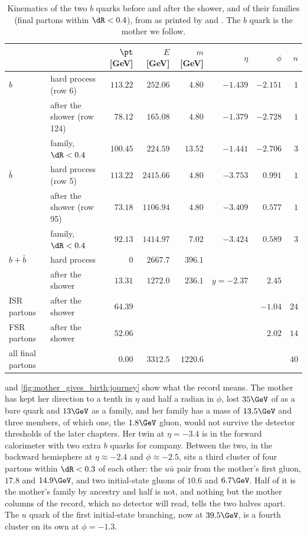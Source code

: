 \begin{table}[htbp]\centering\small
\caption[Kinematics of the two $b$ quarks and their families after the shower]{Kinematics
of the two $b$ quarks before and after the shower, and of their families
(final partons within $\dR<0.4$), from  as printed by
 and . The
$b$ quark is the mother we follow.}
\label{tab:mother_gives_birth:kinematics}
\footnotesize
\begin{tabular}{llrrrrrr}\toprule
 & & $\pt$ [GeV] & $E$ [GeV] & $m$ [GeV] & $\eta$ & $\phi$ & $n$ \\ \midrule
$b$ & hard process (row 6) & $113.22$ & $252.06$ & $4.80$ & $-1.439$ & $-2.151$ & $1$ \\
    & after the shower (row 124) & $78.12$ & $165.08$ & $4.80$ & $-1.379$ & $-2.728$ & $1$ \\
    & family, $\dR<0.4$ & $100.45$ & $224.59$ & $13.52$ & $-1.441$ & $-2.706$ & $3$ \\ \midrule
$\bar b$ & hard process (row 5) & $113.22$ & $2415.66$ & $4.80$ & $-3.753$ & $0.991$ & $1$ \\
    & after the shower (row 95) & $73.18$ & $1106.94$ & $4.80$ & $-3.409$ & $0.577$ & $1$ \\
    & family, $\dR<0.4$ & $92.13$ & $1414.97$ & $7.02$ & $-3.424$ & $0.589$ & $3$ \\ \midrule
$b+\bar b$ & hard process & $0$ & $2667.7$ & $396.1$ & & & \\
    & after the shower & $13.31$ & $1272.0$ & $236.1$ & $y=-2.37$ & $2.45$ & \\ \midrule
ISR partons & after the shower & $64.39$ & & & & $-1.04$ & $24$ \\
FSR partons & after the shower & $52.06$ & & & & $2.02$ & $14$ \\
all final partons & & $0.00$ & $3312.5$ & $1220.6$ & & & $40$ \\
\bottomrule
\end{tabular}
\end{table}

 and \cref{fig:mother_gives_birth:journey}
show what the record means. The mother has kept her direction to a tenth
in $\eta$ and half a radian in $\phi$, lost $35\GeV$ of \pt as a bare
quark and $13\GeV$ as a family, and her family has a mass of $13.5\GeV$
and three members, of which one, the $1.8\GeV$ gluon, would not survive
the detector thresholds of the later chapters. Her twin at $\eta=-3.4$ is
in the forward calorimeter with two extra $b$ quarks for company. Between
the two, in the backward hemisphere at $\eta\approx-2.4$ and
$\phi\approx-2.5$, sits a third cluster of four partons within $\dR<0.3$
of each other: the $u\bar u$ pair from the mother's first gluon, $17.8$ and
$14.9\GeV$, and two initial-state gluons of $10.6$ and $6.7\GeV$. Half of
it is the mother's family by ancestry and half is not, and nothing but the
mother columns of the record, which no detector will read, tells the two
halves apart. The $u$ quark of the first initial-state branching, now at
$39.5\GeV$, is a fourth cluster on its own at $\phi=-1.3$.

